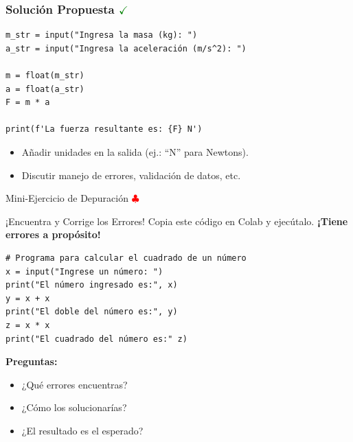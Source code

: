\documentclass[10pt]{beamer}
\begin{document}
\begin{frame}[fragile]
\frametitle{Solución Propuesta \hfill \textcolor{green}{$\checkmark$}}
\begin{verbatim}
m_str = input("Ingresa la masa (kg): ")
a_str = input("Ingresa la aceleración (m/s^2): ")

m = float(m_str)
a = float(a_str)
F = m * a

print(f'La fuerza resultante es: {F} N')
\end{verbatim}
\begin{itemize}
  \item Añadir unidades en la salida (ej.: “N” para Newtons).
  \item Discutir manejo de errores, validación de datos, etc.
\end{itemize}
\end{frame}


\begin{frame}[fragile]{Mini-Ejercicio de Depuración \hfill \textcolor{red}{$\clubsuit$}}
\begin{block}{¡Encuentra y Corrige los Errores!}
  Copia este código en Colab y ejecútalo. \textbf{¡Tiene errores a propósito!}
\end{block}

\begin{verbatim}
# Programa para calcular el cuadrado de un número
x = input("Ingrese un número: ")
print("El número ingresado es:", x)
y = x + x
print("El doble del número es:", y)
z = x * x
print("El cuadrado del número es:" z)
\end{verbatim}


\textbf{Preguntas:} 
\begin{itemize}
  \item ¿Qué errores encuentras?
  \item ¿Cómo los solucionarías?
  \item ¿El resultado es el esperado?
\end{itemize}
\end{frame}
\end{document}
